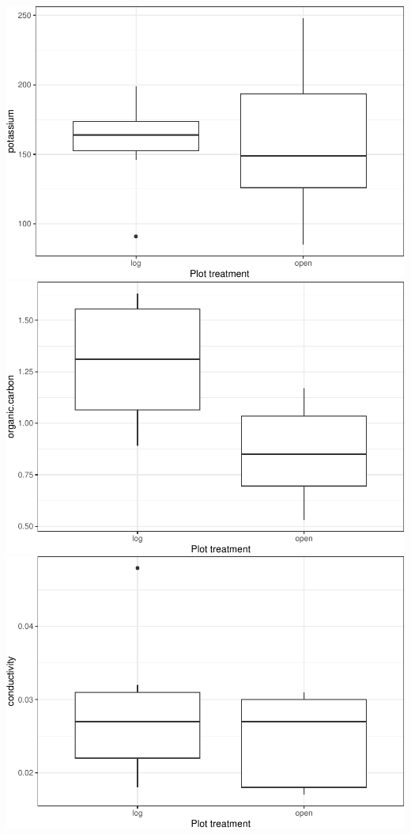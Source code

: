 \documentclass[
]{article}
\begin{document}
\includegraphics{log-project-aubrie-winnie_files/figure-latex/unnamed-chunk-8-4.pdf}
\includegraphics{log-project-aubrie-winnie_files/figure-latex/unnamed-chunk-8-5.pdf}
\includegraphics{log-project-aubrie-winnie_files/figure-latex/unnamed-chunk-8-6.pdf}
\end{document}
